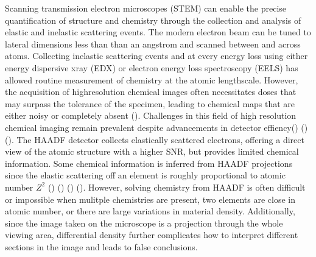 \documentclass[letterpaper,10pt,english]{jupyterBook}
\begin{document}
\sphinxAtStartPar
Scanning transmission electron microscopes (STEM) can enable the precise quantification of structure and chemistry through the collection and analysis of elastic and inelastic scattering events. The modern electron beam can be tuned to lateral dimensions less than than an angstrom and scanned between and across atoms. Collecting inelastic scattering events and at every energy loss using either energy dispersive x\sphinxhyphen{}ray (EDX) or electron energy loss spectroscopy (EELS) has allowed routine measurement of chemistry at the atomic length\sphinxhyphen{}scale. However, the acquisition of high\sphinxhyphen{}resolution chemical images often necessitates doses that may surpass the tolerance of the specimen, leading to chemical maps that are either noisy or completely absent ().  Challenges in this field of high resolution chemical imaging remain prevalent despite advancements in detector effiency() () (). The HAADF detector collects elastically scattered electrons, offering a direct view of the atomic structure with a higher SNR, but provides limited chemical information. Some chemical information is inferred from HAADF projections since the elastic scattering off an element is roughly proportional to atomic number \(Z^2\) () () () (). However, solving chemistry from HAADF is often difficult or impossible when mulitple chemistries are present, two elements are close in atomic number, or there are large variations in material density. Additionally, since the image taken on the microscope is a projection through the whole viewing area, differential density further complicates how to interpret different sections in the image and leads to false conclusions.
\end{document}
